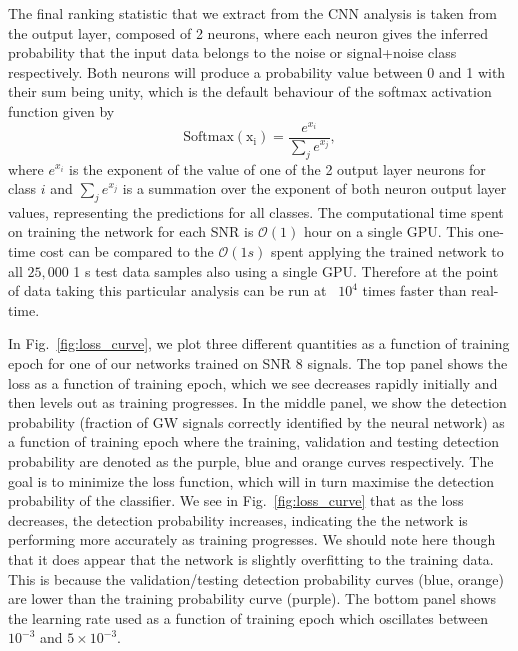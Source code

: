 %
%
The final ranking statistic that we extract from the \ac{CNN} analysis is 
taken from the output layer, composed of 2 neurons, where each neuron 
gives the inferred probability that the input data belongs to the 
noise or signal+noise class respectively. Both neurons
will produce a probability value between 0 and 1 with their sum 
being unity, which is the default behaviour of the 
softmax activation function given by 
%
\begin{equation}
    \mathrm{Softmax(x_i)} = \frac{e^{x_i}}{\sum_j e^{x_j}},
\end{equation}
%
where $e^{x_i}$ is the exponent of the value of one of the 2 output layer 
neurons for class $i$ and 
$\sum_j e^{x_j}$ is a summation over the exponent of both neuron 
output layer values, representing the predictions for all classes. 
The computational time spent on training the network for 
each SNR is $\mathcal{O}(1)$ hour on a single GPU. This one-time 
cost can be compared to the $\mathcal{O}(1 s)$ spent applying the 
trained network to all $25,000$ 1 s test data samples also 
using a single GPU. Therefore at the point of data taking this 
particular analysis can be run at ~$10^{4}$ times faster than real-time.

%
%
In Fig.~\ref{fig:loss_curve}, we plot three different quantities 
as a function of training epoch for one of our networks trained 
on \ac{SNR} 8 signals. The top panel shows the loss as a 
function of training epoch, which we see decreases rapidly 
initially and then levels out as training progresses. In the 
middle panel, we show the detection probability (fraction of \ac{GW} 
signals correctly identified by the neural network) as a 
function of training epoch where the training, validation and testing 
detection probability are denoted as the purple, blue and orange curves 
respectively. The goal is to minimize the loss 
function, which will in turn maximise the detection probability of the 
classifier. We see in Fig.~\ref{fig:loss_curve} that as the loss decreases, 
the detection probability increases, indicating the the network is 
performing more accurately as training progresses. We should note here though 
that it does appear that the network is slightly overfitting to the 
training data. This is because the validation/testing detection probability 
curves (blue, orange) are lower than the training probability curve (purple). 
The bottom panel 
shows the learning rate used as a function of training epoch which 
oscillates between $10^{-3}$ and $5 \times 10^{-3}$. 

